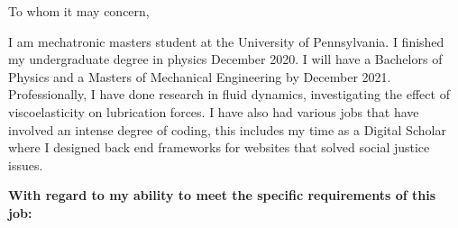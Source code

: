 \par{\Large
To whom it may concern,
}

\par{\large

\quad I am mechatronic masters student at the University of Pennsylvania. I finished my undergraduate degree in physics December 2020. I will have a Bachelors of Physics and a Masters of Mechanical Engineering by December 2021.  Professionally, I have done research in fluid dynamics, investigating the effect of viscoelasticity on lubrication forces. I have also had various jobs that have involved an intense degree of coding, this includes my time as a Digital Scholar where I designed back end frameworks for websites that solved social justice issues.

}

\textbf{\Large
With regard to my ability to meet the specific requirements of this job:
\\
}

